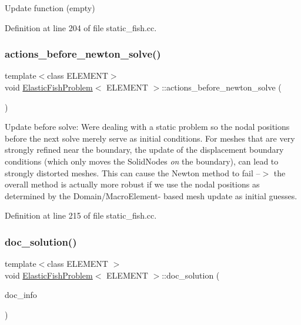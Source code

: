 Update function (empty) 



Definition at line 204 of file static\+\_\+fish.\+cc.

\mbox{\label{classElasticFishProblem_a7c22fcff8d94166797e87d70017540d6}} 
\subsubsection{\texorpdfstring{actions\+\_\+before\+\_\+newton\+\_\+solve()}{actions\_before\_newton\_solve()}}
{\footnotesize\ttfamily template$<$class E\+L\+E\+M\+E\+NT$>$ \\
void \hyperlink{classElasticFishProblem}{Elastic\+Fish\+Problem}$<$ E\+L\+E\+M\+E\+NT $>$\+::actions\+\_\+before\+\_\+newton\+\_\+solve (\begin{DoxyParamCaption}{ }\end{DoxyParamCaption})\hspace{0.3cm}{\ttfamily [inline]}}



Update before solve\+: We\textquotesingle{}re dealing with a static problem so the nodal positions before the next solve merely serve as initial conditions. For meshes that are very strongly refined near the boundary, the update of the displacement boundary conditions (which only moves the Solid\+Nodes {\itshape on} the boundary), can lead to strongly distorted meshes. This can cause the Newton method to fail --$>$ the overall method is actually more robust if we use the nodal positions as determined by the Domain/\+Macro\+Element-\/ based mesh update as initial guesses. 



Definition at line 215 of file static\+\_\+fish.\+cc.

\mbox{\label{classElasticFishProblem_a5cd7dbd2bc99ccf850c1a58d0b401979}} 
\subsubsection{\texorpdfstring{doc\+\_\+solution()}{doc\_solution()}}
{\footnotesize\ttfamily template$<$class E\+L\+E\+M\+E\+NT $>$ \\
void \hyperlink{classElasticFishProblem}{Elastic\+Fish\+Problem}$<$ E\+L\+E\+M\+E\+NT $>$\+::doc\+\_\+solution (\begin{DoxyParamCaption}\item[{Doc\+Info \&}]{doc\+\_\+info }\end{DoxyParamCaption})}



